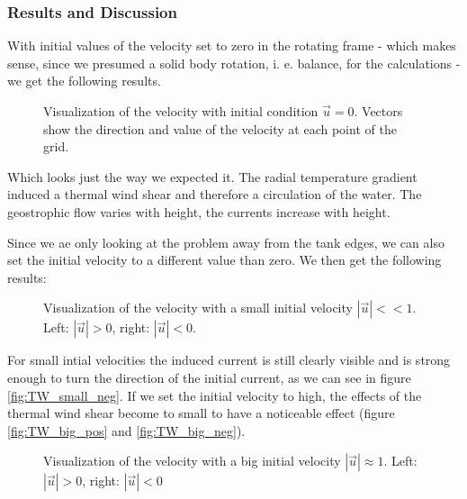 \documentclass[12pt, a4paper]{article} %
\begin{document}
		\subsubsection{Results and Discussion}
			With initial values of the velocity set to zero in the rotating frame - which makes sense, since we presumed a solid body rotation, i. e. balance, for the calculations - we get the following results.
			
			\begin{figure}[h]
				\centering
					\qquad
				\caption{Visualization of the velocity with initial condition $\vec{u}=0$. Vectors show the direction and value of the velocity at each point of the grid.}
			\end{figure}
			
			Which looks just the way we expected it. The radial temperature gradient induced a thermal wind shear and therefore a circulation of the water. The geostrophic flow varies with height, the currents increase with height.
			
			Since we ae only looking at the problem away from the tank edges, we can also set the initial velocity to a different value than zero. We then get the following results: 
			
			\begin{figure}[h]
				\centering
					\qquad
				\caption{Visualization of the velocity with a small initial velocity $|\vec{u}|<<1$. Left: $|\vec{u}|>0$, right: $|\vec{u}|<0$.}
			\end{figure}
			
			For small intial velocities the induced current is still clearly visible and is strong enough to turn the direction of the initial current, as we can see in figure \ref{fig:TW_small_neg}. If we set the initial velocity to high, the effects of the thermal wind shear become to small to have a noticeable effect (figure \ref{fig:TW_big_pos} and \ref{fig:TW_big_neg}).
			
			\begin{figure}[h]
				\centering
					\qquad
				\caption{Visualization of the velocity with a big initial velocity $|\vec{u}| \approx 1$. Left: $|\vec{u}|>0$, right: $|\vec{u}|<0$}
			\end{figure}
			
\end{document}
